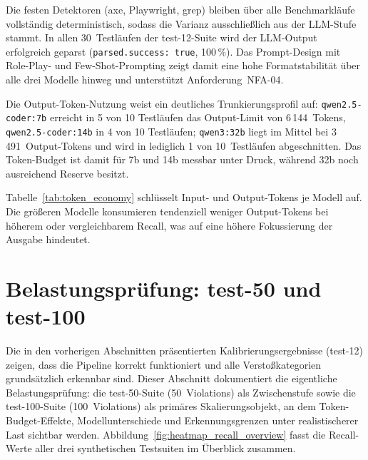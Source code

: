 Die festen Detektoren (axe, Playwright, grep) bleiben über alle Benchmarkläufe vollständig deterministisch, sodass die Varianz ausschließlich aus der \ac{LLM}-Stufe stammt. In allen 30~Testläufen der test-12-Suite wird der \ac{LLM}-Output erfolgreich geparst (\texttt{parsed.success: true}, 100\,\%). Das Prompt-Design mit Role-Play- und Few-Shot-Prompting zeigt damit eine hohe Formatstabilität über alle drei Modelle hinweg und unterstützt Anforderung~\ac{NFA}-04.

Die Output-Token-Nutzung weist ein deutliches Trunkierungsprofil auf: \texttt{qwen2.5-coder:7b} erreicht in 5 von 10 Testläufen das Output-Limit von 6\,144~Tokens, \texttt{qwen2.5-coder:14b} in 4 von 10 Testläufen; \texttt{qwen3:32b} liegt im Mittel bei 3\,491~Output-Tokens und wird in lediglich 1 von 10~Testläufen abgeschnitten. Das Token-Budget ist damit für 7b und 14b messbar unter Druck, während 32b noch ausreichend Reserve besitzt.

Tabelle~\ref{tab:token_economy} schlüsselt Input- und Output-Tokens je Modell auf. Die größeren Modelle konsumieren tendenziell weniger Output-Tokens bei höherem oder vergleichbarem Recall, was auf eine höhere Fokussierung der Ausgabe hindeutet.

\section{Belastungsprüfung: test-50 und test-100}
\label{sec:eval_erweiterung}

Die in den vorherigen Abschnitten präsentierten Kalibrierungsergebnisse (test-12) zeigen, dass die Pipeline korrekt funktioniert und alle Verstoßkategorien grundsätzlich erkennbar sind. Dieser Abschnitt dokumentiert die eigentliche Belastungsprüfung: die test-50-Suite (50~Violations) als Zwischenstufe sowie die test-100-Suite (100~Violations) als primäres Skalierungsobjekt, an dem Token-Budget-Effekte, Modellunterschiede und Erkennungsgrenzen unter realistischerer Last sichtbar werden. Abbildung~\ref{fig:heatmap_recall_overview} fasst die Recall-Werte aller drei synthetischen Testsuiten im Überblick zusammen.

